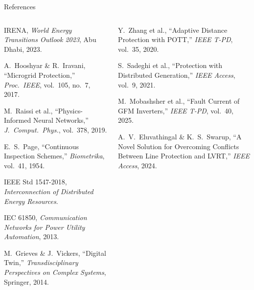 \documentclass[10pt,aspectratio=169]{beamer}
\begin{document}
\begin{frame}[allowframebreaks]{References}
  \begin{columns}[T]
      \begin{enumerate}[{[}1{]}]\itemsep4pt\footnotesize
        \item IRENA, \textit{World Energy Transitions Outlook 2023},
          Abu Dhabi, 2023.
        \item A.~Hooshyar \& R.~Iravani, ``Microgrid Protection,''
          \textit{Proc.\ IEEE}, vol.~105, no.~7, 2017.
        \item M.~Raissi et al., ``Physics-Informed Neural Networks,''
          \textit{J.\ Comput.\ Phys.}, vol.~378, 2019.
        \item E.~S.~Page, ``Continuous Inspection Schemes,''
          \textit{Biometrika}, vol.~41, 1954.
        \item IEEE Std 1547-2018, \textit{Interconnection of Distributed
          Energy Resources}.
        \item IEC 61850, \textit{Communication Networks for Power Utility
          Automation}, 2013.
        \item M.~Grieves \& J.~Vickers, ``Digital Twin,''
          \textit{Transdisciplinary Perspectives on Complex Systems},
          Springer, 2014.
      \end{enumerate}
      \begin{enumerate}[{[}8{]}]\itemsep4pt\footnotesize
        \item Y.~Zhang et al., ``Adaptive Distance Protection with POTT,''
          \textit{IEEE T-PD}, vol.~35, 2020.
        \item S.~Sadeghi et al., ``Protection with Distributed Generation,''
          \textit{IEEE Access}, vol.~9, 2021.
        \item M.~Mobashsher et al., ``Fault Current of GFM Inverters,''
          \textit{IEEE T-PD}, vol.~40, 2025.
        \item A.~V.~Eluvathingal \& K.~S.~Swarup, ``A Novel Solution for
          Overcoming Conflicts Between Line Protection and LVRT,''
          \textit{IEEE Access}, 2024.
      \end{enumerate}
  \end{columns}
\end{frame}
\end{document}
